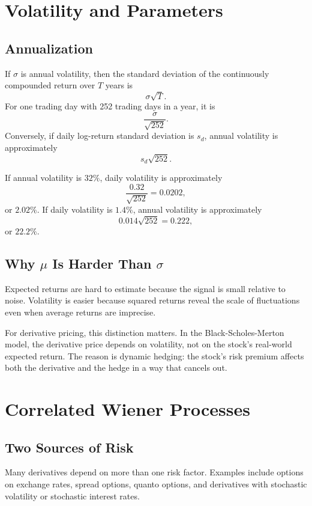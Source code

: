 \section{Volatility and Parameters}

\subsection{Annualization}

If $\sigma$ is annual volatility, then the standard deviation of the
continuously compounded return over $T$ years is
\[
    \sigma\sqrt{T}.
\]
For one trading day with 252 trading days in a year, it is
\[
    \frac{\sigma}{\sqrt{252}}.
\]
Conversely, if daily log-return standard deviation is $s_d$, annual volatility
is approximately
\[
    s_d\sqrt{252}.
\]

\begin{exmp}
If annual volatility is $32\%$, daily volatility is approximately
\[
    \frac{0.32}{\sqrt{252}}=0.0202,
\]
or $2.02\%$. If daily volatility is $1.4\%$, annual volatility is approximately
\[
    0.014\sqrt{252}=0.222,
\]
or $22.2\%$.
\end{exmp}

\subsection{Why $\mu$ Is Harder Than $\sigma$}

Expected returns are hard to estimate because the signal is small relative to
noise. Volatility is easier because squared returns reveal the scale of
fluctuations even when average returns are imprecise.

For derivative pricing, this distinction matters. In the Black-Scholes-Merton
model, the derivative price depends on volatility, not on the stock's real-world
expected return. The reason is dynamic hedging: the stock's risk premium affects
both the derivative and the hedge in a way that cancels out.

\section{Correlated Wiener Processes}

\subsection{Two Sources of Risk}

Many derivatives depend on more than one risk factor. Examples include options
on exchange rates, spread options, quanto options, and derivatives with
stochastic volatility or stochastic interest rates.


